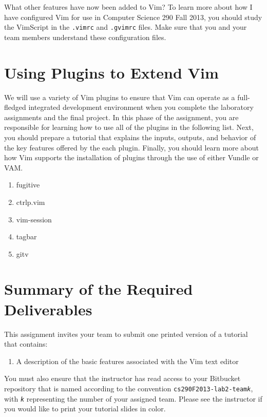 What other features have now been added to Vim?  To learn more about how I have configured Vim for use in Computer
Science 290 Fall 2013, you should study the VimScript in the {\tt .vimrc} and {\tt .gvimrc} files.  Make sure that you
and your team members understand these configuration files.

\section*{Using Plugins to Extend Vim}

We will use a variety of Vim plugins to ensure that Vim can operate as a full-fledged integrated development environment
when you complete the laboratory assignments and the final project.  In this phase of the assignment, you are
responsible for learning how to use all of the plugins in the following list.  Next, you should prepare a tutorial that 
explains the inputs, outputs, and behavior of the key features offered by the each plugin.  Finally, you should learn
more about how Vim supports the installation of plugins through the use of either Vundle or VAM.

\begin{enumerate}

	\item fugitive

	\item ctrlp.vim

	\item vim-session

	\item tagbar

	\item gitv

\end{enumerate}

\section*{Summary of the Required Deliverables}

This assignment invites your team to submit one printed version of a tutorial that contains:

\begin{enumerate}
	
	\item A description of the basic features associated with the Vim text editor

\end{enumerate}

You must also ensure that the instructor has read access to your Bitbucket repository that is named according to the
convention {\tt cs290F2013-lab2-team{\em k}}, with {\tt {\em k}} representing the number of your assigned team. Please
see the instructor if you would like to print your tutorial slides in color.



